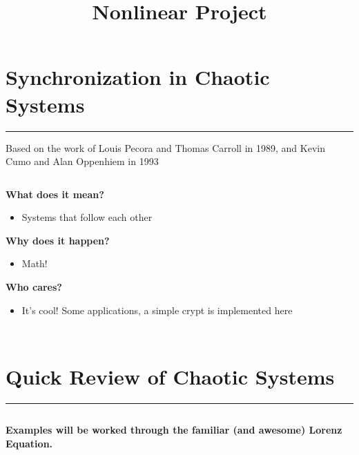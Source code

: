 \documentclass{article}
\title{Nonlinear Project}
\begin{document}
    
    
    \maketitle
    
    

    
    \section{Synchronization in Chaotic
Systems}\label{synchronization-in-chaotic-systems}

\begin{center}\rule{3in}{0.4pt}\end{center}

Based on the work of Louis Pecora and Thomas Carroll in 1989, and Kevin
Cumo and Alan Oppenhiem in 1993

$\:$

\textbf{What does it mean?}

\begin{itemize}
\itemsep1pt\parskip0pt
\item
  Systems that follow each other
\end{itemize}

\textbf{Why does it happen?}

\begin{itemize}
\itemsep1pt\parskip0pt
\item
  Math!
\end{itemize}

\textbf{Who cares?}

\begin{itemize}
\itemsep1pt\parskip0pt
\item
  It's cool! Some applications, a simple crypt is implemented here
\end{itemize}

$\:$

$\:$

    \section{Quick Review of Chaotic
Systems}\label{quick-review-of-chaotic-systems}

\begin{center}\rule{3in}{0.4pt}\end{center}

$\:$

\textbf{Examples will be worked through the familiar (and awesome)
Lorenz Equation.}
\end{document}
